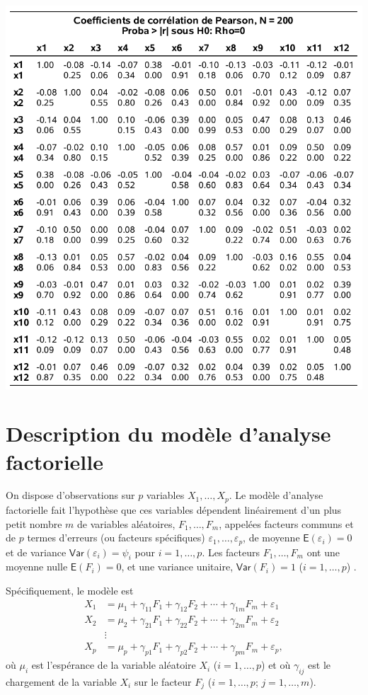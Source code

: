 \documentclass[
  11pt,
  letterpaper,
]{book}
\theoremstyle{definition}
\theoremstyle{definition}
\theoremstyle{definition}
\theoremstyle{definition}
\theoremstyle{remark}
\begin{document}
\begin{center}\includegraphics[width=0.9\linewidth]{figures/01-facto-e2} \end{center}

\hypertarget{description-du-moduxe8le-danalyse-factorielle}{%
\section{Description du modèle d'analyse factorielle}\label{description-du-moduxe8le-danalyse-factorielle}}

On dispose d'observations sur \(p\) variables \(X_1, \ldots, X_p\). Le modèle d'analyse factorielle fait l'hypothèse que ces variables dépendent linéairement d'un plus petit nombre \(m\) de variables aléatoires, \(F_1, \ldots, F_m\), appelées facteurs communs et de \(p\) termes d'erreurs (ou facteurs spécifiques) \(\varepsilon_1, \ldots, \varepsilon_p\), de moyenne \({\mathsf E}\left(\varepsilon_i\right)=0\) et de variance \({\mathsf{Var}}\left(\varepsilon_i\right)=\psi_i\) pour \(i=1, \ldots, p\). Les facteurs \(F_1, \ldots, F_m\) ont une moyenne nulle \({\mathsf E}\left(F_i\right)=0\), et une variance unitaire, \({\mathsf{Var}}\left(F_i\right)=1\) (\(i=1, \ldots, p\)) .

Spécifiquement, le modèle est
\begin{align*}
X_1 &= \mu_1 + \gamma_{11}F_1 + \gamma_{12} F_2 + \cdots + \gamma_{1m}F_m + \varepsilon_1\\
X_2 &= \mu_2 + \gamma_{21}F_1 + \gamma_{22} F_2 + \cdots + \gamma_{2m}F_m + \varepsilon_2\\
&\vdots \\
X_p &= \mu_p + \gamma_{p1}F_1 + \gamma_{p2} F_2 + \cdots + \gamma_{pm}F_m + \varepsilon_p, 
\end{align*}
où \(\mu_i\) est l'espérance de la variable aléatoire \(X_i\) (\(i=1, \ldots, p\)) et où \(\gamma_{ij}\) est le chargement de la variable \(X_i\) sur le facteur \(F_j\) (\(i=1, \ldots, p\); \(j=1, \ldots, m\)).
\end{document}
